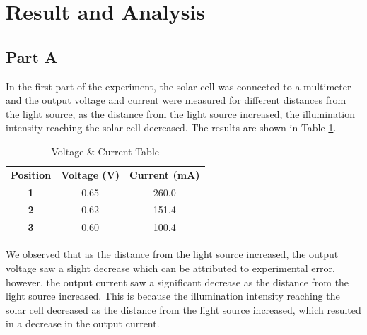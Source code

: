\documentclass[a4paper, 12pt, english]{article}
\begin{document}
\section{Result and Analysis}
\subsection{Part A}
In the first part of the experiment, the solar cell was connected to a
multimeter and the output voltage and current were measured for different
distances from the light source, as the distance from the light source
increased, the illumination intensity reaching the solar cell decreased. The
results are shown in Table \ref{tab:Table 1}.

\begin{table}[H]
	\caption{\label{tab:Table 1} Voltage \& Current Table}
	\centering
	\begin{tabular}{c c c}
		\toprule
		\textbf{Position}
		           & \textbf{Voltage (V)}
		           & \textbf{Current (mA)}         \\
		\cmidrule[0.4pt](r{0.125em}){1-1}%
		\cmidrule[0.4pt](lr{0.125em}){2-2}%
		\cmidrule[0.4pt](lr{0.125em}){3-3}%
		\textbf{1} & 0.65                  & 260.0 \\
		\textbf{2} & 0.62                  & 151.4 \\
		\textbf{3} & 0.60                  & 100.4 \\
		\bottomrule
	\end{tabular}
\end{table}

We observed that as the distance from the light source increased, the output
voltage saw a slight decrease which can be attributed to experimental error,
however, the output current saw a significant decrease as the distance from the
light source increased. This is because the illumination intensity reaching the
solar cell decreased as the distance from the light source increased, which
resulted in a decrease in the output current.
\end{document}
